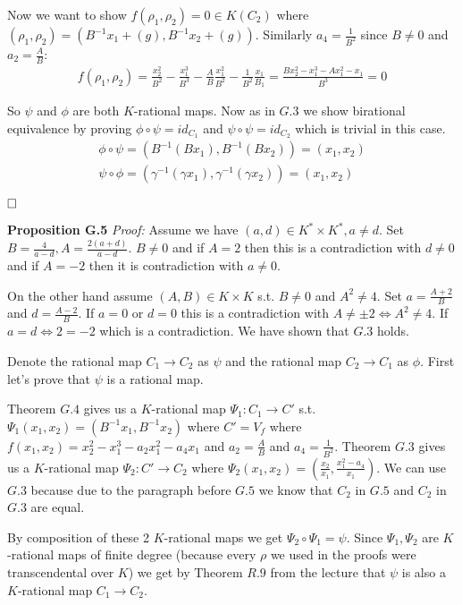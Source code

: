 \documentclass[12pt, a4paper]{article}
\newcommand{\qed}{\hfill\square}
\begin{document}
Now we want to show $f(\rho_1, \rho_2) = 0 \in K(C_2)$ where $(\rho_1, \rho_2) = \left( B^{-1}x_1 + (g), B^{-1}x_2+(g) \right)$. Similarly $a_4 = \frac{1}{B^2}$ since $B \neq 0$ and $a_2 = \frac{A}{B}$:
\begin{gather*}
f(\rho_1, \rho_2) = \frac{x_2^2}{B^2} - \frac{x_1^3}{B^3} - \frac{A}{B}\frac{x_1^2}{B^2}-\frac{1}{B^2}\frac{x_1}{B_1} = \frac{Bx_2^2-x_1^3-Ax_1^2-x_1}{B^3} = 0
\end{gather*}

So $\psi$ and $\phi$ are both $K$-rational maps. Now as in $G.3$ we show birational equivalence by proving $\phi \circ \psi = id_{C_1}$ and $\psi \circ \psi = id_{C_2}$ which is trivial in this case.
\begin{gather*}
\phi \circ \psi = (B^{-1}(Bx_1), B^{-1}(Bx_2)) = (x_1, x_2)\\
\psi \circ \phi = (\gamma^{-1}(\gamma x_1), \gamma^{-1}(\gamma x_2)) = (x_1, x_2)
\end{gather*}

$\qed$

\textbf{Proposition G.5} \textit{Proof:}
Assume we have $(a,d) \in K^* \times K^*, a \neq d$. Set $B =  \frac{4}{a-d}, A = \frac{2(a+d)}{a-d}$. $B \neq 0$ and if $A = 2$ then this is a contradiction with $d \neq 0$ and if $A = -2$ then it is contradiction with $a \neq 0$. 

On the other hand assume $(A,B) \in K \times K$ s.t. $B \neq 0$ and $A^2 \neq 4$. Set $a = \frac{A+2}{B}$ and $d = \frac{A-2}{B}$. If $a = 0$ or $d = 0$ this is a contradiction with $A \neq \pm 2 \iff A^2 \neq 4$. If $a=d \iff 2=-2$ which is a contradiction. We have shown that $G.3$ holds.

Denote the rational map $C_1 \rightarrow C_2$ as $\psi$ and the rational map $C_2 \rightarrow C_1$ as $\phi$. First let's prove that $\psi$ is a rational map.

Theorem $G.4$ gives us a $K$-rational map $\Psi_1: C_1 \rightarrow C'$ s.t. $\Psi_1(x_1, x_2) = (B^{-1}x_1, B^{-1}x_2)$ where $C' = V_f$ where $f(x_1, x_2) = x_2^2-x_1^3-a_2x_1^2-a_4x_1$ and $a_2 = \frac{A}{B}$ and $a_4 = \frac{1}{B^2}$. Theorem $G.3$ gives us a $K$-rational map $\Psi_2: C' \rightarrow C_2$ where $\Psi_2(x_1, x_2) = \left(\frac{x_2}{x_1}, \frac{x_1^2-a_4}{x_1} \right)$. We can use $G.3$ because due to the paragraph before $G.5$ we know that $C_2$ in $G.5$ and $C_2$ in $G.3$ are equal.

By composition of these 2 $K$-rational maps we get $\Psi_2 \circ \Psi_1 = \psi$. Since $\Psi_1, \Psi_2$ are $K$-rational maps of finite degree (because every $\rho$ we used in the proofs were transcendental over $K$) we get by Theorem $R.9$ from the lecture that $\psi$ is also a $K$-rational map $C_1 \rightarrow C_2$.
\end{document}
